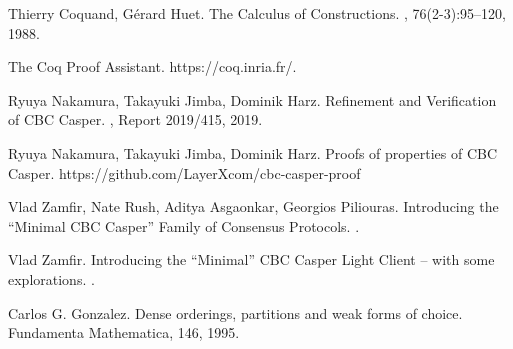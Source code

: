 \documentclass[runningheads]{llncs}
\begin{document}
\begin{thebibliography}{99}

 Thierry Coquand, Gérard Huet.
\newblock The Calculus of Constructions.
, 76(2-3):95--120, 1988.

\newblock The Coq Proof Assistant. 
\newblock https://coq.inria.fr/.

 Ryuya Nakamura, Takayuki Jimba, Dominik Harz.
\newblock Refinement and Verification of CBC Casper. 
, Report 2019/415, 2019.

 Ryuya Nakamura, Takayuki Jimba, Dominik Harz.
\newblock Proofs of properties of CBC Casper.
\newblock https://github.com/LayerXcom/cbc-casper-proof

 Vlad Zamfir, Nate Rush, Aditya Asgaonkar, Georgios Piliouras.
\newblock Introducing the ``Minimal CBC Casper'' Family of Consensus Protocols. 
. 

 Vlad Zamfir. 
\newblock Introducing the ``Minimal'' CBC Casper Light Client -- with some explorations. 
. 

 Carlos G. Gonzalez. 
\newblock Dense orderings, partitions and weak forms of choice. 
\newblock Fundamenta Mathematica, 146, 1995.

\end{thebibliography}




\end{document}
